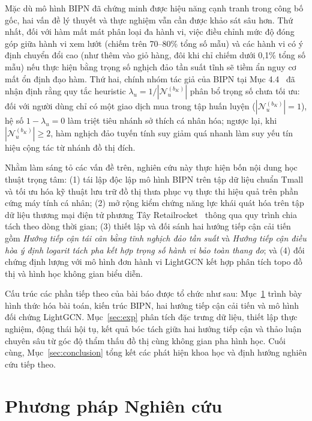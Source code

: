 \documentclass{llncs}
\begin{document}
Mặc dù mô hình BIPN đã chứng minh được hiệu năng cạnh tranh trong công bố gốc, hai vấn đề lý thuyết và thực nghiệm vẫn cần được khảo sát sâu hơn. Thứ nhất, đối với hàm mất mát phân loại đa hành vi, việc điều chỉnh mức độ đóng góp giữa hành vi xem lướt (chiếm trên 70--80\% tổng số mẫu) và các hành vi có ý định chuyển đổi cao (như thêm vào giỏ hàng, đôi khi chỉ chiếm dưới 0{,}1\% tổng số mẫu) nếu thực hiện bằng trọng số nghịch đảo tần suất tĩnh sẽ tiềm ẩn nguy cơ mất ổn định đạo hàm. Thứ hai, chính nhóm tác giả của BIPN tại Mục 4.4~\cite{yan2024bipn} đã nhận định rằng quy tắc heuristic $\lambda_u = 1/|\mathcal{N}_u^{(b_K)}|$ phân bổ trọng số chưa tối ưu: đối với người dùng chỉ có một giao dịch mua trong tập huấn luyện ($|\mathcal{N}_u^{(b_K)}| = 1$), hệ số $1 - \lambda_u = 0$ làm triệt tiêu nhánh sở thích cá nhân hóa; ngược lại, khi $|\mathcal{N}_u^{(b_K)}| \ge 2$, hàm nghịch đảo tuyến tính suy giảm quá nhanh làm suy yếu tín hiệu cộng tác từ nhánh đồ thị đích.

Nhằm làm sáng tỏ các vấn đề trên, nghiên cứu này thực hiện bốn nội dung học thuật trọng tâm: (1) tái lập độc lập mô hình BIPN trên tập dữ liệu chuẩn Tmall và tối ưu hóa kỹ thuật lưu trữ đồ thị thưa phục vụ thực thi hiệu quả trên phần cứng máy tính cá nhân; (2) mở rộng kiểm chứng năng lực khái quát hóa trên tập dữ liệu thương mại điện tử phương Tây Retailrocket~\cite{retailrocket2016} thông qua quy trình chia tách theo dòng thời gian; (3) thiết lập và đối sánh hai hướng tiếp cận cải tiến gồm \emph{Hướng tiếp cận tái cân bằng tĩnh nghịch đảo tần suất} và \emph{Hướng tiếp cận điều hòa ý định logarit tách pha kết hợp trọng số hành vi bảo toàn thang đo}; và (4) đối chứng định lượng với mô hình đơn hành vi LightGCN kết hợp phân tích topo đồ thị và hình học không gian biểu diễn.

Cấu trúc các phần tiếp theo của bài báo được tổ chức như sau: Mục~\ref{sec:method} trình bày hình thức hóa bài toán, kiến trúc BIPN, hai hướng tiếp cận cải tiến và mô hình đối chứng LightGCN. Mục~\ref{sec:exp} phân tích đặc trưng dữ liệu, thiết lập thực nghiệm, động thái hội tụ, kết quả bóc tách giữa hai hướng tiếp cận và thảo luận chuyên sâu từ góc độ thẩm thấu đồ thị cùng không gian pha hình học. Cuối cùng, Mục~\ref{sec:conclusion} tổng kết các phát hiện khoa học và định hướng nghiên cứu tiếp theo.

\section{Phương pháp Nghiên cứu}
\label{sec:method}
\end{document}
